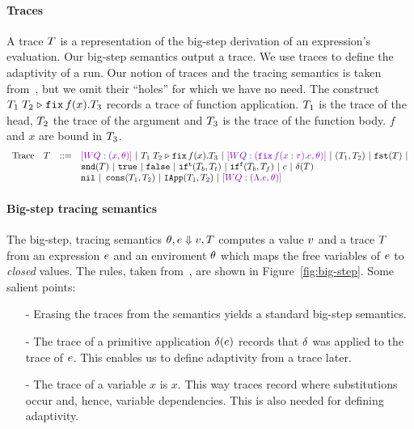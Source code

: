 \documentclass[a4paper,11pt]{article}
\newcommand{\wq}[1]{\textcolor[rgb]{.50,0.0,0.7}{[WQ: #1]}}
\theoremstyle{definition}
\begin{document}
\paragraph{Traces}
A trace $T$ is a representation of the big-step derivation of an
expression's evaluation. Our big-step semantics output a trace. We use
traces to define the adaptivity of a run. Our notion of traces and the
tracing semantics is taken from~\cite[Section 4]{perera:dep}, but we
omit their ``holes'' for which we have no need. The construct
$T_1 \; T_2 \mathrel{\triangleright} {\mathop{\mathtt{fix}} f(x).T_3}$ records a trace of function
application. $T_1$ is the trace of the head, $T_2$ the trace of
the argument and $T_3$ is the trace of the function body. $f$ and
$x$ are bound in $T_3$.
%
\[\begin{array}{llll}
\mbox{Trace} & \tr & ::= & \wq{(x, \env)} ~|~ \trapp{\tr_1}{\tr_2}{f}{x}{\tr_3} ~|~
\wq{ (\trfix f(x:\tau).e, \env) } ~|~ (\tr_1, \tr_2) ~|~ \trprojl(\tr) ~|\\ 
%
& & & \trprojr(\tr) ~|~ \trtrue ~|~ \trfalse ~|~ \trift(\tr_b, \tr_t)
~|~ \triff(\tr_b, \tr_f) ~|~ \trconst ~|~ \trop(\tr) \\
%
& & & \trnil ~|~ \trcons (\tr_1, \tr_2) ~|~ \triapp{\tr_1}{\tr_2} ~|~
      \wq {(\eilam \expr, \env)}
\end{array}\]


\paragraph{Big-step tracing semantics}
The big-step, tracing semantics $\theta, e \mathrel{\Downarrow} v, T$
computes a value $v$ and a trace $T$ from an expression $e$
and an enviroment $\theta$ which maps the free variables of $e$ to
\emph{closed} values. The rules, taken from~\cite{perera:dep}, are
shown in Figure~\ref{fig:big-step}. Some salient points:
\begin{itemize}
\item[-] Erasing the traces from the semantics yields a standard
  big-step semantics.
\item[-] The trace of a primitive application $\delta(e)$
  records that $\delta$ was applied to the trace of
  $e$. This enables us to define adaptivity from a trace later.
\item[-] The trace of a variable $x$ is $x$. This way traces record
  where substitutions occur and, hence, variable dependencies. This is
  also needed for defining adaptivity.
\end{itemize}
\end{document}
